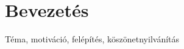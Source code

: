 \section*{Bevezetés}
\label{sec:bevezetes}
Téma, motiváció, felépítés, köszönetnyilvánítás
\clearpage